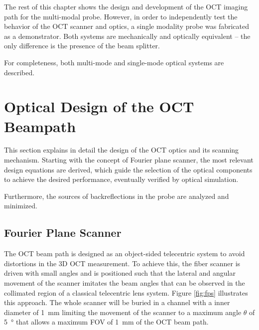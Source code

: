 The rest of this chapter shows the design and development of the OCT imaging path for the multi-modal probe. However, in order to independently test the behavior of the OCT scanner and optics, a single modality probe was fabricated as a demonstrator. Both systems are mechanically and optically equivalent -- the only difference is the presence of the beam splitter. 

For completeness, both multi-mode and single-mode optical systems are described.


\section{Optical Design of the OCT Beampath}
\label{ch:Optical}
This section explains in detail the design of the OCT optics and its scanning mechanism. Starting with the concept of Fourier plane scanner, the most relevant design equations are derived, which guide the selection of the optical components to achieve the desired performance, eventually verified by optical simulation. 

Furthermore, the sources of backreflections in the probe are analyzed and minimized.

\subsection{Fourier Plane Scanner}




The OCT beam path is designed as an object-sided telecentric system to avoid distortions in the 3D OCT measurement. To achieve this, the fiber scanner is driven with small angles and is positioned such that the lateral and angular movement of the scanner imitates the beam angles that can be observed in the collimated region of a classical telecentric lens system. Figure \ref{fig:fps} illustrates this approach. The whole scanner will be buried in a channel with a inner diameter of \SI{1}{\milli\meter} limiting the movement of the scanner to a maximum angle $\theta$ of \SI{5}{\degree} that allows a maximum FOV of \SI{1}{\milli\meter} of the OCT beam path.



